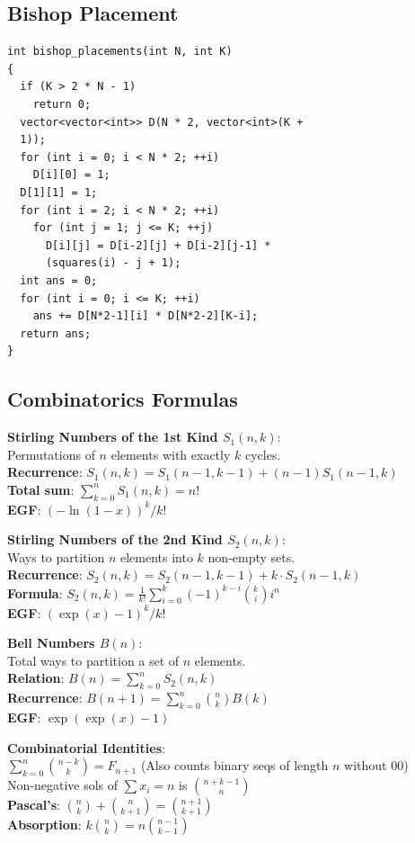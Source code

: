\subsection{Bishop Placement}
\begin{verbatim}
int bishop_placements(int N, int K)
{
  if (K > 2 * N - 1)
    return 0;
  vector<vector<int>> D(N * 2, vector<int>(K +
  1));
  for (int i = 0; i < N * 2; ++i)
    D[i][0] = 1;
  D[1][1] = 1;
  for (int i = 2; i < N * 2; ++i)
    for (int j = 1; j <= K; ++j)
      D[i][j] = D[i-2][j] + D[i-2][j-1] *
      (squares(i) - j + 1);
  int ans = 0;
  for (int i = 0; i <= K; ++i)
    ans += D[N*2-1][i] * D[N*2-2][K-i];
  return ans;
}
\end{verbatim}
\subsection{Combinatorics Formulas}

\textbf{Stirling Numbers of the 1st Kind $S_1(n,k)$}: \\
Permutations of $n$ elements with exactly $k$ cycles. \\
\textbullet{} \textbf{Recurrence}: $S_1(n,k) = S_1(n-1,k-1) + (n-1)S_1(n-1,k)$ \\
\textbullet{} \textbf{Total sum}: $\sum_{k=0}^n S_1(n,k) = n!$ \\
\textbullet{} \textbf{EGF}: $(-\ln(1-x))^k / k!$

\textbf{Stirling Numbers of the 2nd Kind $S_2(n,k)$}: \\
Ways to partition $n$ elements into $k$ non-empty sets. \\
\textbullet{} \textbf{Recurrence}: $S_2(n,k) = S_2(n-1,k-1) + k \cdot S_2(n-1,k)$ \\
\textbullet{} \textbf{Formula}: $S_2(n,k) = \frac{1}{k!} \sum_{i=0}^k (-1)^{k-i} \binom{k}{i} i^n$ \\
\textbullet{} \textbf{EGF}: $(\exp(x)-1)^k / k!$

\textbf{Bell Numbers $B(n)$}: \\
Total ways to partition a set of $n$ elements. \\
\textbullet{} \textbf{Relation}: $B(n) = \sum_{k=0}^n S_2(n,k)$ \\
\textbullet{} \textbf{Recurrence}: $B(n+1) = \sum_{k=0}^n \binom{n}{k} B(k)$ \\
\textbullet{} \textbf{EGF}: $\exp(\exp(x)-1)$

\textbf{Combinatorial Identities}: \\
\textbullet{} $\sum_{k=0}^n \binom{n-k}{k} = F_{n+1}$ (Also counts binary seqs of length $n$ without 00) \\
\textbullet{} Non-negative sols of $\sum x_i = n$ is $\binom{n+k-1}{n}$ \\
\textbullet{} \textbf{Pascal's}: $\binom{n}{k} + \binom{n}{k+1} = \binom{n+1}{k+1}$ \\
\textbullet{} \textbf{Absorption}: $k\binom{n}{k} = n\binom{n-1}{k-1}$

